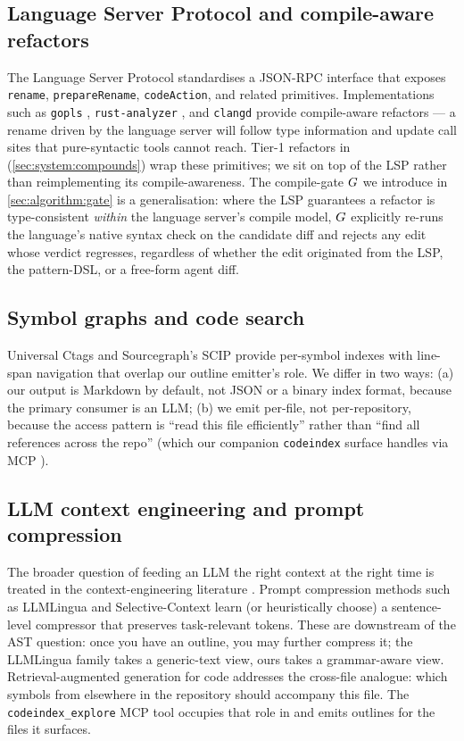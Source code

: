 \subsection{Language Server Protocol and compile-aware refactors}

The Language Server Protocol \cite{lsp_spec} standardises a
JSON-RPC interface that exposes \texttt{rename}, \texttt{prepareRename},
\texttt{codeAction}, and related primitives. Implementations such as
\texttt{gopls} \cite{gopls}, \texttt{rust-analyzer}
\cite{rust_analyzer}, and \texttt{clangd} \cite{clangd} provide
compile-aware refactors --- a rename driven by the language server
will follow type information and update call sites that pure-syntactic
tools cannot reach. Tier-1 refactors in \blackrim
(\cref{sec:system:compounds}) wrap these primitives; we sit on top of
the LSP rather than reimplementing its compile-awareness. The
compile-gate $G$ we introduce in \cref{sec:algorithm:gate} is a
generalisation: where the LSP guarantees a refactor is type-consistent
\emph{within} the language server's compile model, $G$ explicitly
re-runs the language's native syntax check on the candidate diff and
rejects any edit whose verdict regresses, regardless of whether the
edit originated from the LSP, the pattern-DSL, or a free-form agent
diff.

\subsection{Symbol graphs and code search}

Universal Ctags \cite{ctags} and Sourcegraph's SCIP \cite{scip}
provide per-symbol indexes with line-span navigation that overlap our
outline emitter's role. We differ in two ways: (a) our output is
Markdown by default, not JSON or a binary index format, because the
primary consumer is an LLM; (b) we emit per-file, not per-repository,
because the access pattern is ``read this file efficiently'' rather
than ``find all references across the repo'' (which our companion
\texttt{codeindex} surface handles via MCP \cite{codeindex_spec}).

\subsection{LLM context engineering and prompt compression}

The broader question of feeding an LLM the right context at the right
time is treated in the context-engineering literature
\cite{liu2024context_engineering}. Prompt compression methods such as
LLMLingua \cite{llmlingua} and Selective-Context \cite{selective_context}
learn (or heuristically choose) a sentence-level compressor that
preserves task-relevant tokens. These are downstream of the AST
question: once you have an outline, you may further compress it; the
LLMLingua family takes a generic-text view, ours takes a
grammar-aware view. Retrieval-augmented generation for code
\cite{rag_for_code} addresses the cross-file analogue: which symbols
from elsewhere in the repository should accompany this file. The
\texttt{codeindex\_explore} MCP tool \cite{codeindex_spec} occupies
that role in \blackrim and emits outlines for the files it surfaces.

